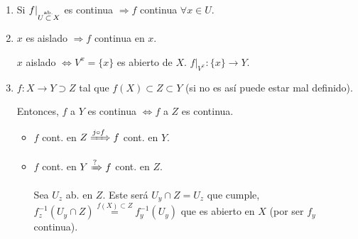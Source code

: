 \begin{obs}
\begin{enumerate}
    \item Si $f|_{U \stackrel{\text{ab.}}{\subset} X}$ es continua $\Rightarrow f$ continua $\forall x \in U$.

    \item $x$ es aislado $\Rightarrow f$ continua en $x$. 
    \begin{demo}
        $x$ aislado $\Leftrightarrow V^x = \{x\}$ es abierto de $X$. $f|_{V^x} : \{x\} \rightarrow Y$.
    \end{demo}

    \item $f: X \rightarrow Y \supset Z$ tal que $f\left( X \right) \subset Z \subset Y$ (si no es así puede estar mal definido).

    Entonces, $f$ a $Y$ es continua $\Leftrightarrow f$ a $Z$ es continua.
    \begin{demo}
        \begin{itemize}
            \item $f$ cont. en $Z \xRightarrow{j \circ f} f$ cont. en $Y$. %
            \item $f$ cont. en $Y \xRightarrow{?} f$ cont. en $Z$. 

            Sea $U_z$ ab. en $Z$. Este será $U_y \cap Z = U_z$ que cumple, $f_z^{-1}\left( U_y \cap Z \right) \stackrel{f\left( X \right) \subset Z}{=}  f_y^{-1}\left( U_y \right)$ que es abierto en $X$ (por ser $f_y$ continua).
        \end{itemize}
    \end{demo}
\end{enumerate}
\end{obs}

